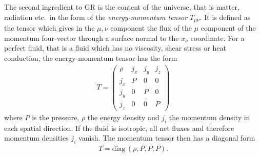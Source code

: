 \documentclass[twoside,a4paper, 12pt]{article}
\numberwithin{equation}{section}
\begin{document}
\noindent
The second ingredient to GR is the content of the universe, that is matter, radiation etc.\ in the form of the \emph{energy-momentum tensor} $T_{\mu \nu}$.
It is defined as the tensor which gives in the $\mu, \nu$ component the flux of the $\mu$ component of the
momentum four-vector through a surface normal to the $x_\nu$ coordinate.
For a perfect fluid, that is a fluid which has no viscosity, shear stress or heat conduction,
the energy-momentum tensor has the form
\begin{align}
    T = \begin{pmatrix}
    \rho & j_x & j_y & j_z \\
    j_x & P & 0 & 0 \\
    j_y & 0 & P & 0 \\
    j_z & 0 & 0 & P
    \end{pmatrix}
\end{align}
where $P$ is the pressure, $\rho$ the energy density and $j_i$ the momentum density in each spatial 
direction.
If the fluid is isotropic, all net fluxes and therefore momentum densities $j_i$ vanish. The momentum tensor then has a diagonal form \cite[Eq. 3.4]{TheEarlyUniverseKolbAndTurner}
\begin{align}
    \label{eq:energy_momentum_tensor_diag}
    T = \mathrm{diag} \, (\rho, P, P, P).
\end{align}
\end{document}
